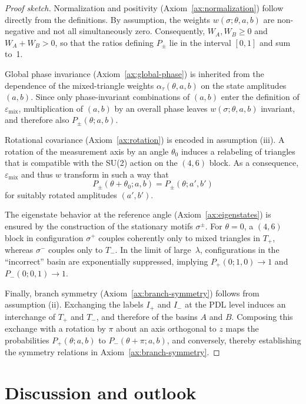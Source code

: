 \documentclass[11pt,a4paper]{article}
\numberwithin{equation}{section}
\theoremstyle{definition}
\begin{document}
\begin{proof}[Proof sketch]
Normalization and positivity (Axiom~\ref{ax:normalization}) follow directly from the definitions. By assumption, the weights $w(\sigma;\theta,a,b)$ are non-negative and not all simultaneously zero. Consequently, $W_A,W_B\ge 0$ and $W_A+W_B>0$, so that the ratios defining $P_\pm$ lie in the interval $[0,1]$ and sum to~1.

Global phase invariance (Axiom~\ref{ax:global-phase}) is inherited from the dependence of the mixed-triangle weights $\alpha_\tau(\theta,a,b)$ on the state amplitudes $(a,b)$. Since only phase-invariant combinations of $(a,b)$ enter the definition of $\varepsilon_{\mathrm{mix}}$, multiplication of $(a,b)$ by an overall phase leaves $w(\sigma;\theta,a,b)$ invariant, and therefore also $P_\pm(\theta;a,b)$.

Rotational covariance (Axiom~\ref{ax:rotation}) is encoded in assumption (iii). A rotation of the measurement axis by an angle $\theta_0$ induces a relabeling of triangles that is compatible with the SU(2) action on the $(4,6)$ block. As a consequence, $\varepsilon_{\mathrm{mix}}$ and thus $w$ transform in such a way that
\[
P_{\pm}(\theta+\theta_0;a,b) = P_{\pm}(\theta;a',b')
\]
for suitably rotated amplitudes $(a',b')$.

The eigenstate behavior at the reference angle (Axiom~\ref{ax:eigenstates}) is ensured by the construction of the stationary motifs $\sigma^\pm$. For $\theta=0$, a $(4,6)$ block in configuration $\sigma^+$ couples coherently only to mixed triangles in $T_+$, whereas $\sigma^-$ couples only to $T_-$. In the limit of large~$\lambda$, configurations in the ``incorrect'' basin are exponentially suppressed, implying $P_+(0;1,0)\to 1$ and $P_-(0;0,1)\to 1$.

Finally, branch symmetry (Axiom~\ref{ax:branch-symmetry}) follows from assumption (ii). Exchanging the labels $I_+$ and $I_-$ at the PDL level induces an interchange of $T_+$ and $T_-$, and therefore of the basins $A$ and $B$. Composing this exchange with a rotation by $\pi$ about an axis orthogonal to $z$ maps the probabilities $P_+(\theta;a,b)$ to $P_-(\theta+\pi;a,b)$, and conversely, thereby establishing the symmetry relations in Axiom~\ref{ax:branch-symmetry}.
\end{proof}

\section{Discussion and outlook}
\label{sec:discussion}
\end{document}

